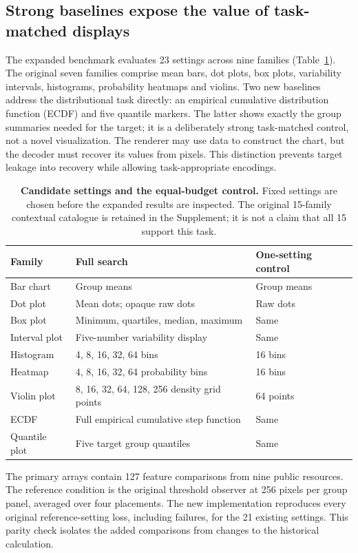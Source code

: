 \documentclass[11pt]{article}
\begin{document}
\subsection*{Strong baselines expose the value of task-matched displays}
The expanded benchmark evaluates 23 settings across nine families (Table~\ref{tab:settings}). The original seven families comprise mean bars, dot plots, box plots, variability intervals, histograms, probability heatmaps and violins. Two new baselines address the distributional task directly: an empirical cumulative distribution function (ECDF) and five quantile markers. The latter shows exactly the group summaries needed for the target; it is a deliberately strong task-matched control, not a novel visualization. The renderer may use data to construct the chart, but the decoder must recover its values from pixels. This distinction prevents target leakage into recovery while allowing task-appropriate encodings.

\begin{table}[ht]\centering\small
\caption{\textbf{Candidate settings and the equal-budget control.} Fixed settings are chosen before the expanded results are inspected. The original 15-family contextual catalogue is retained in the Supplement; it is not a claim that all 15 support this task.}\label{tab:settings}
\begin{tabular}{p{3.1cm}p{6.2cm}p{4.2cm}}\toprule
Family & Full search & One-setting control\\\midrule
Bar chart & Group means & Group means\\
Dot plot & Mean dots; opaque raw dots & Raw dots\\
Box plot & Minimum, quartiles, median, maximum & Same\\
Interval plot & Five-number variability display & Same\\
Histogram & 4, 8, 16, 32, 64 bins & 16 bins\\
Heatmap & 4, 8, 16, 32, 64 probability bins & 16 bins\\
Violin plot & 8, 16, 32, 64, 128, 256 density grid points & 64 points\\
ECDF & Full empirical cumulative step function & Same\\
Quantile plot & Five target group quantiles & Same\\\bottomrule
\end{tabular}
\end{table}

The primary arrays contain 127 feature comparisons from nine public resources.\cite{wdbc,heart,failure,kidney,liver,retina,har,bidmc,wrist} The reference condition is the original threshold observer at 256 pixels per group panel, averaged over four placements. The new implementation reproduces every original reference-setting loss, including failures, for the 21 existing settings. This parity check isolates the added comparisons from changes to the historical calculation.
\end{document}
